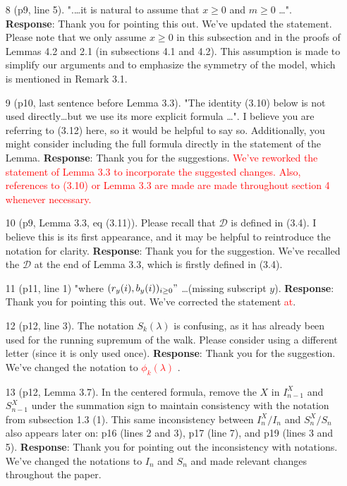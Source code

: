 \documentclass[11pt,a4paper]{article}
\numberwithin{equation}{section}
\def\TBF#1{\textcolor{red}{#1}} %
\def\TBC#1{\textcolor{red}{#1}} %
\begin{document}
\begin{itemize}
		
		
		\item[8] (p9, line 5). ".\dots it is natural to assume that $x \geq 0$ and $m \geq 0$ \dots".
		\subitem \textbf{Response}:  Thank you for pointing this out.  We've updated the statement. Please note that we only assume $x\geq 0$ in this subsection and in the proofs of Lemmas 4.2 and 2.1 (in subsections 4.1 and 4.2). This assumption is made to simplify our arguments and to emphasize the symmetry of the model, which is mentioned in Remark 3.1.
		
		\item [9] (p10, last sentence before Lemma 3.3). "The identity (3.10) below is not used directly\dots but we use its more explicit formula \dots ". I believe you are referring to (3.12) here, so it would be helpful to say so. Additionally, you might consider including the full formula directly in the statement of the Lemma.
		\subitem \textbf{Response}: Thank you for the suggestions. \TBF{We've reworked the statement of Lemma 3.3 to incorporate the suggested changes. Also, references to (3.10) or Lemma 3.3 are made are made throughout section 4 whenever necessary.}
		
		\item [10] (p9, Lemma 3.3, eq (3.11)). Please recall that $\mathcal{D}$ is defined in (3.4). I believe this is its first appearance, and it may be helpful to reintroduce the notation for clarity.
		\subitem \textbf{Response}:  Thank you for the suggestion. We've recalled the $\mathcal{D}$ at the end of Lemma 3.3, which is firstly defined in (3.4).
		
		
		
		\item [11] (p11, line 1) "where $(r_y(i),b_y(i))_{i\geq 0}"$ \dots (missing subscript $y$).
		\subitem \textbf{Response}:  Thank you for pointing this out.  We've corrected the statement \TBF{at}.
		
		
		\item[12] (p12, line 3). The notation $S_k(\lambda)$ is confusing, as it has already been used for the running supremum of the walk. Please consider using a different letter (since it is only used once).
		\subitem \textbf{Response}:  Thank you for the suggestion.  We've changed the notation to \TBC{${\phi}_k(\lambda) $} .
		
		
		\item[13] (p12, Lemma 3.7). In the centered formula, remove the $X$ in $I^X_{n-1}$
		and $S^X_{n-1}$ under the summation sign to maintain consistency with the notation from subsection 1.3 (1). This same inconsistency between $I^X_n /I_n$ and $S^X_n/S_n$ also appears later on: p16 (lines 2 and 3), p17 (line 7), and p19 (lines 3 and 5).
		\subitem \textbf{Response}:  Thank you for pointing out the inconsistency with notations.  We've changed the notations to $I_n$ and $S_n$ and made relevant changes throughout the paper.
		

\end{itemize}
\end{document}

